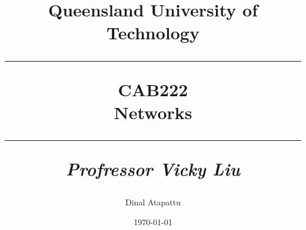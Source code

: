 \documentclass{book}
\begin{document}
    \title{
            Queensland University of Technology\\
            \rule{\linewidth}{0.5pt}
        \centering
        \textbf{CAB222} \\
        Networks\\
        \vspace{0.4cm}
        \rule{\linewidth}{1.5pt}
        \small{\textit{Profressor Vicky Liu}}
    }
    \author{Dinal Atapattu}
    \date{\today}
    \maketitle
    \thispagestyle{empty}
    \tableofcontents
\end{document}
